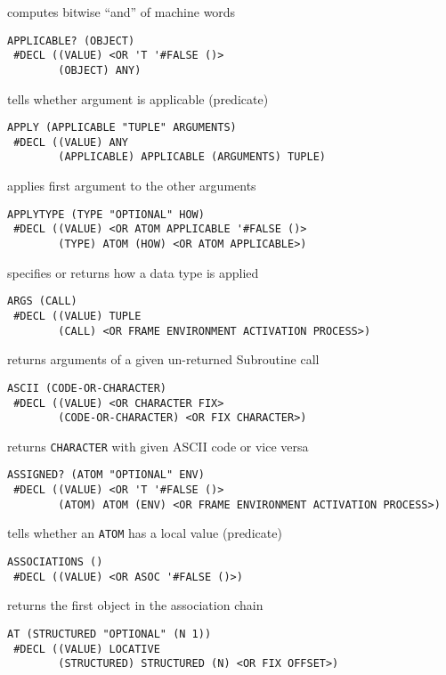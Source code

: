 \documentclass[a4paper]{scrbook}
\begin{document}
computes bitwise ``and'' of machine words

\begin{verbatim}
APPLICABLE? (OBJECT)
 #DECL ((VALUE) <OR 'T '#FALSE ()>
        (OBJECT) ANY)
\end{verbatim}

tells whether argument is applicable (predicate)

\begin{verbatim}
APPLY (APPLICABLE "TUPLE" ARGUMENTS)
 #DECL ((VALUE) ANY
        (APPLICABLE) APPLICABLE (ARGUMENTS) TUPLE)
\end{verbatim}

applies first argument to the other arguments

\begin{verbatim}
APPLYTYPE (TYPE "OPTIONAL" HOW)
 #DECL ((VALUE) <OR ATOM APPLICABLE '#FALSE ()>
        (TYPE) ATOM (HOW) <OR ATOM APPLICABLE>)
\end{verbatim}

specifies or returns how a data type is applied

\begin{verbatim}
ARGS (CALL)
 #DECL ((VALUE) TUPLE
        (CALL) <OR FRAME ENVIRONMENT ACTIVATION PROCESS>)
\end{verbatim}

returns arguments of a given un-returned Subroutine call

\begin{verbatim}
ASCII (CODE-OR-CHARACTER)
 #DECL ((VALUE) <OR CHARACTER FIX>
        (CODE-OR-CHARACTER) <OR FIX CHARACTER>)
\end{verbatim}

returns \texttt{CHARACTER} with given ASCII code or vice versa

\begin{verbatim}
ASSIGNED? (ATOM "OPTIONAL" ENV)
 #DECL ((VALUE) <OR 'T '#FALSE ()>
        (ATOM) ATOM (ENV) <OR FRAME ENVIRONMENT ACTIVATION PROCESS>)
\end{verbatim}

tells whether an \texttt{ATOM} has a local value (predicate)

\begin{verbatim}
ASSOCIATIONS ()
 #DECL ((VALUE) <OR ASOC '#FALSE ()>)
\end{verbatim}

returns the first object in the association chain

\begin{verbatim}
AT (STRUCTURED "OPTIONAL" (N 1))
 #DECL ((VALUE) LOCATIVE
        (STRUCTURED) STRUCTURED (N) <OR FIX OFFSET>)
\end{verbatim}
\end{document}
